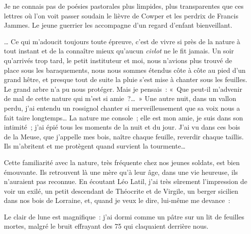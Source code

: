 \documentclass[french,twoside]{book} %
\newenvironment{quoteblock}%
  {\begin{quoting}}
  {\end{quoting}}
\newenvironment{quotebar}{%
    \def\FrameCommand{{\color{rubric!10!}\vrule width 0.5em} \hspace{0.9em}}%
    \def\OuterFrameSep{\itemsep} %
    \MakeFramed {\advance\hsize-\width \FrameRestore}
  }%
  {%
    \endMakeFramed
  }
\renewenvironment{quoteblock}%
  {%
    \savenotes
    \setstretch{0.9}
    \normalfont
    \begin{quotebar}
  }
  {%
    \end{quotebar}
    \spewnotes
  }
\begin{document}
\noindent Je ne connais pas de poésies pastorales plus limpides, plus transparentes que ces lettres où l’on voit passer soudain le lièvre de Cowper et les perdrix de Francis Jammes. Le jeune guerrier les accompagne d’un regard d’enfant bienveillant.‌\par

\begin{quoteblock}
 \noindent … Ce qui m’adoucit toujours toute épreuve, c’est de vivre si près de la nature à tout instant et de la connaître mieux qu’aucun {\itshape civlot} ne le fit jamais. Un soir qu’arrivés trop tard, le petit instituteur et moi, nous n’avions plus trouvé de place sous les baraquements, nous nous sommes étendus côte à côte au pied d’un grand hêtre, et presque tout de suite la pluie s’est mise à chanter sous les feuilles. Le grand arbre n’a pu nous protéger. Mais je pensais : « Que peut-il m’advenir de mal de cette nature qui m’est si amie ?… » Une autre nuit, dans un vallon perdu, j’ai entendu un rossignol chanter si merveilleusement que sa voix nous a fait taire longtemps… La nature me console ; elle est mon amie, je suis dans son intimité ; j’ai épié tous les moments de la nuit et du jour. J’ai vu dans ces bois de la Meuse, que j’appelle mes bois, naître chaque feuille, reverdir chaque taillis. Ils m’abritent et me protègent quand survient la tourmente…‌
 \end{quoteblock}

\noindent Cette familiarité avec la nature, très fréquente chez nos jeunes soldats, est bien émouvante. Ils retrouvent là une mère qu’à leur âge, dans une vie heureuse, ils n’auraient pas reconnue. En écoutant Léo Latil, j’ai très sûrement l’impression de voir un exilé, un petit descendant de Théocrite et de Virgile, un berger sicilien dans nos bois de Lorraine, et, quand je veux le dire, lui-même me devance :‌\par

\begin{quoteblock}
 \noindent Le clair de lune est magnifique : j’ai dormi comme un pâtre sur un lit de feuilles mortes, malgré le bruit effrayant des 75 qui claquaient derrière nous.‌
 \end{quoteblock}
\end{document}
